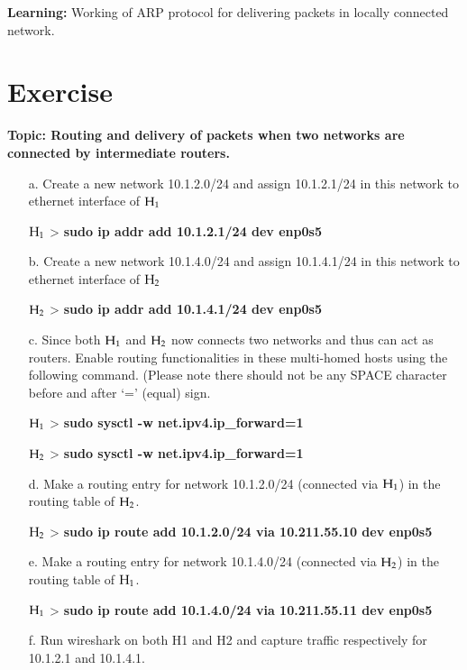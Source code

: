 \begin{multicols}{2}
\textbf{Learning:} Working of ARP protocol for delivering packets in locally connected network.

\section*{Exercise \label{chap2-exe2}}

\textbf{Topic: Routing and delivery of packets when two networks are connected by intermediate routers.}

\begin{itemize}
\item[a.] Create a new network 10.1.2.0/24 and assign 10.1.2.1/24 in this network to ethernet interface of ${\rm H}_{1}$

${\rm H}_{1}$ > \textbf{sudo ip addr add 10.1.2.1/24 dev enp0s5}

\item[b.] Create a new network 10.1.4.0/24 and assign 10.1.4.1/24 in this network to ethernet interface of ${\rm H}_{2}$

${\rm H}_{2}$ > \textbf{sudo ip addr add 10.1.4.1/24 dev enp0s5}

\item[c.] Since both ${\rm H}_{1}$ and ${\rm H}_{2}$ now connects two networks and thus can act as routers. Enable routing functionalities in these multi-homed hosts using the following command. (Please note there should not be any SPACE character before and after ‘=’ (equal) sign.

${\rm H}_{1}$ > \textbf{sudo sysctl -w net.ipv4.ip\_forward=1}

${\rm H}_{2}$ > \textbf{sudo sysctl -w net.ipv4.ip\_forward=1}

\item[d.] Make a routing entry for network 10.1.2.0/24 (connected via ${\rm H}_{1}$) in the routing table of ${\rm H}_{2}$.

${\rm H}_{2}$ > \textbf{sudo ip route add 10.1.2.0/24 via 10.211.55.10 dev enp0s5}

\item[e.] Make a routing entry for network 10.1.4.0/24 (connected via ${\rm H}_{2}$) in the routing table of ${\rm H}_{1}$.

${\rm H}_{1}$ > \textbf{sudo ip route add 10.1.4.0/24 via 10.211.55.11 dev enp0s5}

\item[f.] Run wireshark on both H1 and H2 and capture traffic respectively for 10.1.2.1 and 10.1.4.1.


\end{itemize}
\end{multicols}

